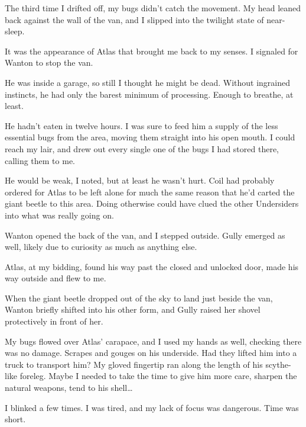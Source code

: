 The third time I drifted off, my bugs didn't catch the movement.  My head leaned back against the wall of the van, and I slipped into the twilight state of near-sleep.



It was the appearance of Atlas that brought me back to my senses.  I signaled for Wanton to stop the van.



He was inside a garage, so still I thought he might be dead.  Without ingrained instincts, he had only the barest minimum of processing.  Enough to breathe, at least.



He hadn't eaten in twelve hours.  I was sure to feed him a supply of the less essential bugs from the area, moving them straight into his open mouth.  I could reach my lair, and drew out every single one of the bugs I had stored there, calling them to me.



He would be weak, I noted, but at least he wasn't hurt.  Coil had probably ordered for Atlas to be left alone for much the same reason that he'd carted the giant beetle to this area.  Doing otherwise could have clued the other Undersiders into what was really going on.



Wanton opened the back of the van, and I stepped outside.  Gully emerged as well, likely due to curiosity as much as anything else.



Atlas, at my bidding, found his way past the closed and unlocked door, made his way outside and flew to me.



When the giant beetle dropped out of the sky to land just beside the van, Wanton briefly shifted into his other form, and Gully raised her shovel protectively in front of her.



My bugs flowed over Atlas' carapace, and I used my hands as well, checking there was no damage.  Scrapes and gouges on his underside.  Had they lifted him into a truck to transport him?  My gloved fingertip ran along the length of his scythe-like foreleg.  Maybe I needed to take the time to give him more care, sharpen the natural weapons, tend to his shell\ldots



I blinked a few times.  I was tired, and my lack of focus was dangerous.  Time was short.




